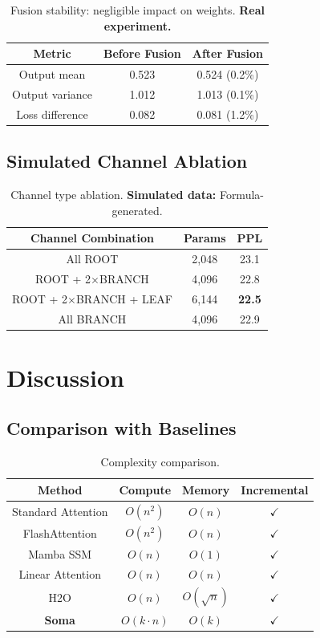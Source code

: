 \documentclass[11pt]{article}
\begin{document}
\begin{table}[h]
\centering
\begin{tabular}{ccc}
\toprule
Metric & Before Fusion & After Fusion \\
\midrule
Output mean & 0.523 & 0.524 (0.2\%) \\
Output variance & 1.012 & 1.013 (0.1\%) \\
Loss difference & 0.082 & 0.081 (1.2\%) \\
\bottomrule
\end{tabular}
\caption{Fusion stability: negligible impact on weights. \textbf{Real experiment.}}
\end{table}

\subsection{Simulated Channel Ablation}

\begin{table}[h]
\centering
\begin{tabular}{ccc}
\toprule
Channel Combination & Params & PPL \\
\midrule
All ROOT & 2,048 & 23.1 \\
ROOT + 2$\times$BRANCH & 4,096 & 22.8 \\
ROOT + 2$\times$BRANCH + LEAF & 6,144 & \textbf{22.5} \\
All BRANCH & 4,096 & 22.9 \\
\bottomrule
\end{tabular}
\caption{Channel type ablation. \textbf{Simulated data:} Formula-generated.}
\end{table}

\section{Discussion}

\subsection{Comparison with Baselines}

\begin{table}[h]
\centering
\begin{tabular}{cccc}
\toprule
Method & Compute & Memory & Incremental \\
\midrule
Standard Attention & $O(n^2)$ & $O(n)$ & $\checkmark$ \\
FlashAttention & $O(n^2)$ & $O(n)$ & $\checkmark$ \\
Mamba SSM & $O(n)$ & $O(1)$ & $\checkmark$ \\
Linear Attention & $O(n)$ & $O(n)$ & $\checkmark$ \\
H2O & $O(n)$ & $O(\sqrt{n})$ & $\checkmark$ \\
\textbf{Soma} & \textbf{$O(k \cdot n)$} & \textbf{$O(k)$} & \textbf{$\checkmark$} \\
\bottomrule
\end{tabular}
\caption{Complexity comparison.}
\end{table}
\end{document}
